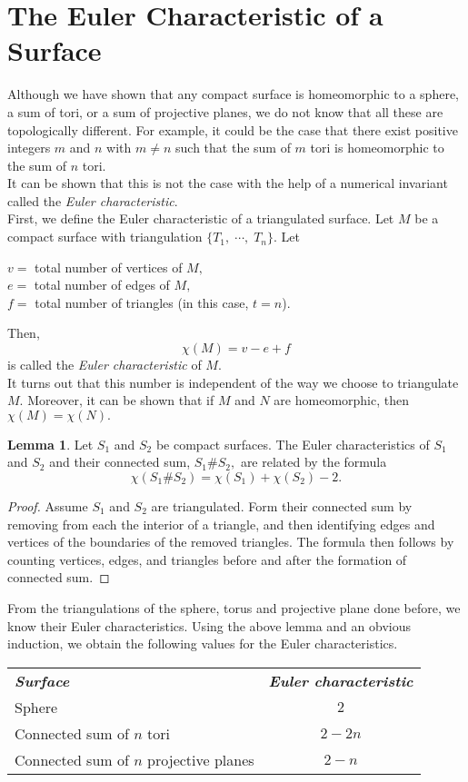 \documentclass{article}
\theoremstyle{definition}
\newtheorem{lem}[theorem]{Lemma}
\begin{document}
\section{The Euler Characteristic of a Surface}
%
Although we have shown that any compact surface is homeomorphic to a sphere, a sum of tori, or a sum of projective planes, we do not know that all these are topologically different. For example, it could be the case that there exist positive integers $m$ and $n$ with $m \neq n$ such that the sum of $m$ tori is homeomorphic to the sum of $n$ tori.\\
It can be shown that this is not the case with the help of a numerical invariant called the \emph{Euler characteristic}.\\
First, we define the Euler characteristic of a triangulated surface. Let $M$ be a compact surface with triangulation $\{T_1,\;\cdots,\;T_n\}.$ Let
\begin{center}
  $v = $ total number of vertices of $M,$\\
  $e = $ total number of edges of $M,$\\
  $f = $ total number of triangles (in this case, $t = n$).
\end{center}
Then,
\[\chi(M) = v - e + f\]
is called the \emph{Euler characteristic} of $M.$\\
It turns out that this number is independent of the way we choose to triangulate $M.$ Moreover, it can be shown that if $M$ and $N$ are homeomorphic, then $\chi(M) = \chi(N).$
\begin{lem}
  Let $S_1$ and $S_2$ be compact surfaces. The Euler characteristics of $S_1$ and $S_2$ and their connected sum, $S_1 \# S_2,$ are related by the formula 
  \[\chi(S_1 \# S_2) = \chi(S_1) + \chi(S_2) - 2.\]
\end{lem}
\begin{proof}
  Assume $S_1$ and $S_2$ are triangulated. Form their connected sum by removing from each the interior of a triangle, and then identifying edges and vertices of the boundaries of the removed triangles. The formula then follows by counting vertices, edges, and triangles before and after the formation of connected sum.
\end{proof}
From the triangulations of the sphere, torus and projective plane done before, we know their Euler characteristics. Using the above lemma and an obvious induction, we obtain the following values for the Euler characteristics.
\begin{center}
  \begin{tabular}{l c}
  \textbf{\emph{Surface}} & \textbf{\emph{Euler characteristic}} \\
  Sphere & $2$ \\
  Connected sum of $n$ tori & $2 - 2n$ \\
  Connected sum of $n$ projective planes & $2 - n$ \\
  \end{tabular}
\end{center}
\end{document}
